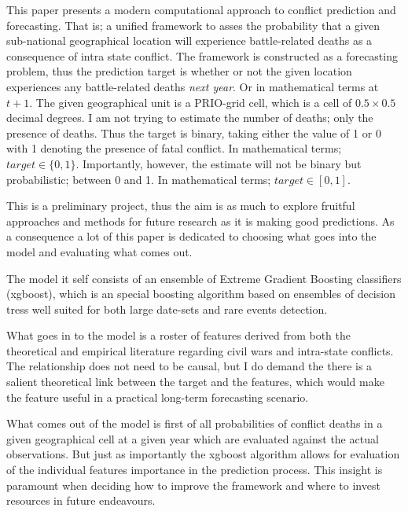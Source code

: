 \documentclass[a4paper]{article}
\begin{document}
This paper presents a modern computational approach to conflict prediction and forecasting. That is; a unified framework to asses the probability that a given sub-national geographical location will experience battle-related deaths as a consequence of intra state conflict. The framework is constructed as a forecasting problem, thus the prediction target is whether or not the given location experiences any battle-related deaths \emph{next year}. Or in mathematical terms at $t+1$. The given geographical unit is a PRIO-grid cell, which is a cell of $0.5\times0.5$ decimal degrees. I am not trying to estimate the number of deaths; only the presence of deaths. Thus the target is binary, taking either the value of 1 or 0 with 1 denoting the presence of fatal conflict. In mathematical terms; $target\in\{0,1\}$. Importantly, however, the estimate will not be binary but probabilistic; between 0 and 1. In mathematical terms; $target\in[0,1]$.\par

This is a preliminary project, thus the aim is as much to explore fruitful approaches and methods for future research as it is making good predictions. As a consequence a lot of this paper is dedicated to choosing what goes into the model and evaluating what comes out.\par

The model it self consists of an ensemble of Extreme Gradient Boosting classifiers (xgboost), which is an special boosting algorithm based on ensembles of decision tress well suited for both large date-sets and rare events detection.\par

What goes in to the model is a roster of features derived from both the theoretical and empirical literature regarding civil wars and intra-state conflicts. The relationship does not need to be causal, but I do demand the there is a salient theoretical link between the target and the features, which would make the feature useful in a practical long-term forecasting scenario.\par

What comes out of the model is first of all probabilities of conflict deaths in a given geographical cell at a given year which are evaluated against the actual observations. But just as importantly the xgboost algorithm allows for evaluation of the individual features importance in the prediction process. This insight is paramount when deciding how to improve the framework and where to invest resources in future endeavours.\par
\end{document}
